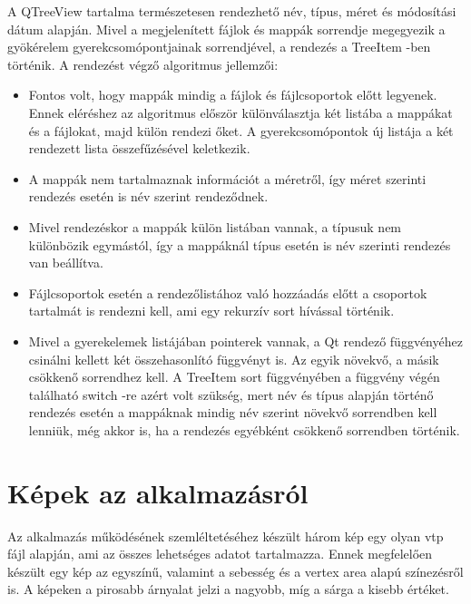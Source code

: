 
\vspace{3mm}

A {\ttfamily QTreeView} tartalma természetesen rendezhető név, típus, méret 
és módosítási dátum alapján. 
Mivel a megjelenített fájlok és mappák sorrendje megegyezik 
a gyökérelem gyerekcsomópontjainak sorrendjével, 
a rendezés a {\ttfamily TreeItem} -ben történik. 
\newline
A rendezést végző algoritmus jellemzői:
\begin{itemize}
\item
Fontos volt, hogy mappák mindig a fájlok és fájlcsoportok előtt legyenek. 
Ennek eléréshez az algoritmus először különválasztja két listába 
a mappákat és a fájlokat, majd külön rendezi őket. 
A gyerekcsomópontok új listája a két rendezett lista összefűzésével keletkezik. 
\item
A mappák nem tartalmaznak információt a méretről, 
így méret szerinti rendezés esetén is név szerint rendeződnek. 
\item
Mivel rendezéskor a mappák külön listában vannak, 
a típusuk nem különbözik egymástól, 
így a mappáknál típus esetén is név szerinti rendezés van beállítva.
\item
Fájlcsoportok esetén a rendezőlistához való hozzáadás előtt 
a csoportok tartalmát is rendezni kell, 
ami egy rekurzív {\ttfamily sort} hívással történik.
\item
Mivel a gyerekelemek listájában pointerek vannak, 
a Qt rendező függvényéhez csinálni kellett két összehasonlító függvényt is. 
Az egyik növekvő, a másik csökkenő sorrendhez kell. 
A {\ttfamily TreeItem} {\ttfamily sort}
függvényében a függvény végén 
található switch -re azért volt szükség, 
mert név és típus alapján történő rendezés esetén 
a mappáknak mindig név szerint növekvő sorrendben kell lenniük,
még akkor is, ha a rendezés egyébként csökkenő sorrendben történik.
\end{itemize}

\section{Képek az alkalmazásról}

Az alkalmazás működésének szemléltetéséhez készült három kép
egy olyan vtp fájl alapján, 
ami az összes lehetséges adatot tartalmazza.
Ennek megfelelően készült egy kép az egyszínű,
valamint a sebesség és a vertex area alapú színezésről is.
A képeken a pirosabb árnyalat jelzi a nagyobb, 
míg a sárga a kisebb értéket.

